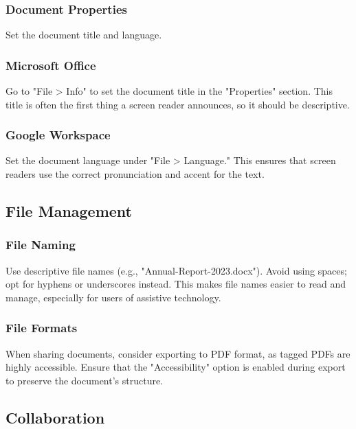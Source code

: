 \subsubsection{Document Properties}\label{ch15:sssec:doc-properties}
Set the document title and language.

\subsubsection{Microsoft Office}\label{ch15:sssec:office-doc-properties}
Go to "File > Info" to set the document title in the "Properties" section. This title is often the first thing a screen reader announces, so it should be descriptive.

\subsubsection{Google Workspace}\label{ch15:sssec:google-doc-properties}
Set the document language under "File > Language." This ensures that screen readers use the correct pronunciation and accent for the text.

\subsection{File Management}\label{ch15:ssec:file-management}

\subsubsection{File Naming}\label{ch15:sssec:file-naming}
Use descriptive file names (e.g., "Annual-Report-2023.docx"). Avoid using spaces; opt for hyphens or underscores instead. This makes file names easier to read and manage, especially for users of assistive technology.

\subsubsection{File Formats}\label{ch15:sssec:file-formats}
When sharing documents, consider exporting to PDF format, as tagged PDFs are highly accessible. Ensure that the "Accessibility" option is enabled during export to preserve the document's structure.

\subsection{Collaboration}\label{ch15:ssec:collaboration}

